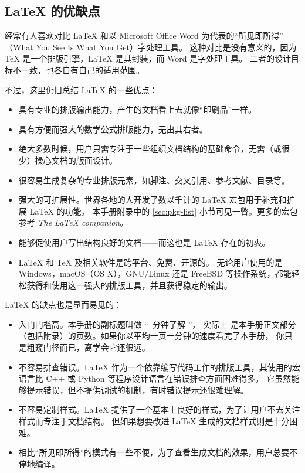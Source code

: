 \subsection{\LaTeX{} 的优缺点}\label{subec:advs}

经常有人喜欢对比 \LaTeX{} 和以 Microsoft Office Word 为代表的“所见即所得”%
（What You See Is What You Get）字处理工具。
这种对比是没有意义的，因为 \TeX{} 是一个排版引擎，\LaTeX{} 是其封装，而 Word 是字处理工具。
二者的设计目标不一致，也各自有自己的适用范围。

不过，这里仍旧总结 \LaTeX{} 的一些优点：
\begin{itemize}
  \item 具有专业的排版输出能力，产生的文档看上去就像“印刷品”一样。
  \item 具有方便而强大的数学公式排版能力，无出其右者。
  \item 绝大多数时候，用户只需专注于一些组织文档结构的基础命令，无需（或很少）操心文档的版面设计。
  \item 很容易生成复杂的专业排版元素，如脚注、交叉引用、参考文献、目录等。
  \item 强大的可扩展性。世界各地的人开发了数以千计的 \LaTeX{} 宏包用于补充和扩展 \LaTeX{} 的功能。
  本手册附录中的 \ref{sec:pkg-list} 小节可见一瞥。更多的宏包参考 \textit{The \LaTeX{} companion}\cite{companion}。
  \item 能够促使用户写出结构良好的文档——而这也是 \LaTeX{} 存在的初衷。
  \item \LaTeX{} 和 \TeX{} 及相关软件是跨平台、免费、开源的。
  无论用户使用的是 Windows，macOS（OS X），GNU/Linux 还是 FreeBSD 等操作系统，都能轻松获得和使用这一强大的排版工具，并且获得稳定的输出。
\end{itemize}

\LaTeX{} 的缺点也是显而易见的：
\begin{itemize}
  \item 入门门槛高。本手册的副标题叫做 “\pageref{lshort-minutes}~分钟了解 \LaTeXe ”，
  实际上 \pageref{lshort-minutes} 是本手册正文部分（包括附录）的页数。如果你以平均一页一分钟的速度看完了本手册，
  你只是粗窥门径而已，离学会它还很远。
  \item 不容易排查错误。\LaTeX{} 作为一个依靠编写代码工作的排版工具，其使用的宏语言比 C++ 或 Python 等程序设计语言在错误排查方面困难得多。
  它虽然能够提示错误，但不提供调试的机制，有时错误提示还很难理解。
  \item 不容易定制样式。\LaTeX{} 提供了一个基本上良好的样式，为了让用户不去关注样式而专注于文档结构。
  但如果想要改进 \LaTeX{} 生成的文档样式则是十分困难。
  \item 相比“所见即所得”的模式有一些不便，为了查看生成文档的效果，用户总要不停地编译。
\end{itemize}

